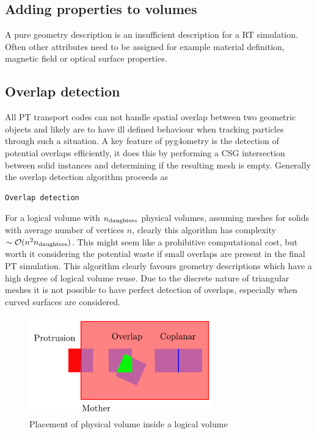 \documentclass[final,5p,times,twocolumn]{elsarticle}
\begin{document}
\subsection{Adding properties to volumes}
A pure geometry description is an insufficient description for a RT simulation. Often other attributes need to be assigned for example material definition, magnetic field or  
optical surface properties.  

\subsection{Overlap detection}
All PT transport codes can not handle spatial overlap between two geometric objects and likely are to have ill defined behaviour when tracking particles  
through such a situation.  A key feature of pyg4ometry is the detection of potential overlaps efficiently, it does this by performing a CSG intersection between solid instances 
and determining if the resulting mesh is empty. Generally the overlap detection algorithm proceeds as 

{\small 
\begin{verbatim}
Overlap detection
\end{verbatim}
} 

For a logical volume with $n_{\rm daughters}$ physical volumes, assuming meshes for solids with average number of vertices $n$, clearly this algorithm has complexity $\sim \mathcal{O}(n^2 n_{\rm daughters})$. This might seem like a prohibitive computational cost, but worth it considering the potential waste if small overlaps are present in the final 
PT simulation. This algorithm clearly favours geometry descriptions which have a high degree of logical volume reuse. Due to the discrete nature of triangular meshes it is not possible to have perfect detection of overlaps, especially when curved surfaces are considered. 
 \begin{figure}[htbp]
\begin{center}
\includegraphics[width=8cm]{./diagrams/overlap.pdf}
\caption{Placement of physical volume inside a logical volume}
\label{fig:lvToPv}
\end{center}
\end{figure} 
\end{document}
